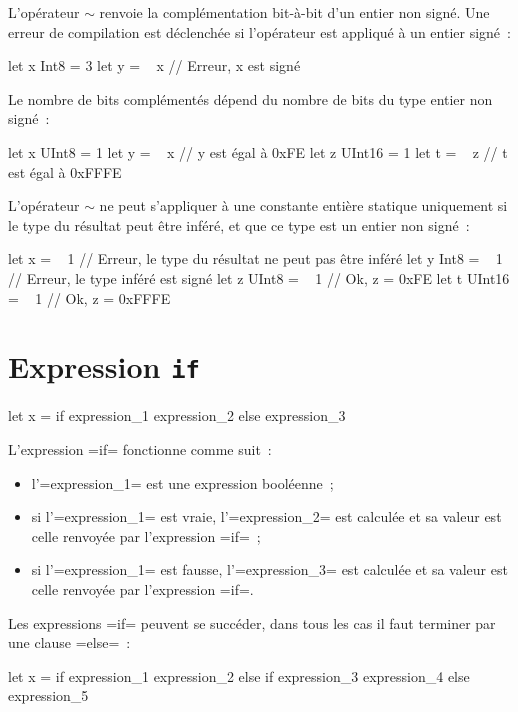 L'opérateur $\sim$ renvoie la complémentation bit-à-bit d'un entier non signé. Une erreur de compilation est déclenchée si l'opérateur est appliqué à un entier signé~:
\begin{OMNIBUS}
let x Int8 = 3
let y = ~ x // Erreur, x est signé
\end{OMNIBUS}

Le nombre de bits complémentés dépend du nombre de bits du type entier non signé~:
\begin{OMNIBUS}
let x UInt8 = 1
let y = ~ x // y est égal à 0xFE
let z UInt16 = 1
let t = ~ z // t est égal à 0xFFFE
\end{OMNIBUS}

L'opérateur $\sim$ ne peut s'appliquer à une constante entière statique uniquement si le type du résultat peut être inféré, et que ce type est un entier non signé~:
\begin{OMNIBUS}
let x = ~ 1 // Erreur, le type du résultat ne peut pas être inféré
let y Int8 = ~ 1 // Erreur, le type inféré est signé
let z UInt8 = ~ 1 // Ok, z = 0xFE
let t UInt16 = ~ 1 // Ok, z = 0xFFFE
\end{OMNIBUS}





\section{Expression \texttt{if}}

\begin{OMNIBUS}
let x = if expression_1 { expression_2 } else { expression_3 }
\end{OMNIBUS}

L'expression \omnibus=if= fonctionne comme suit~:
\begin{itemize}
  \item l'\omnibus=expression_1= est une expression booléenne~;
  \item si l'\omnibus=expression_1= est vraie, l'\omnibus=expression_2= est calculée et sa valeur est celle renvoyée par l'expression \omnibus=if=~;
  \item si l'\omnibus=expression_1= est fausse, l'\omnibus=expression_3= est calculée et sa valeur est celle renvoyée par l'expression \omnibus=if=.
\end{itemize}

Les expressions \omnibus=if= peuvent se succéder, dans tous les cas il faut terminer par une clause \omnibus=else=~:

\begin{OMNIBUS}
let x =
  if expression_1 {
    expression_2
  }else if expression_3 {
    expression_4
  }else{
    expression_5
  }
\end{OMNIBUS}



